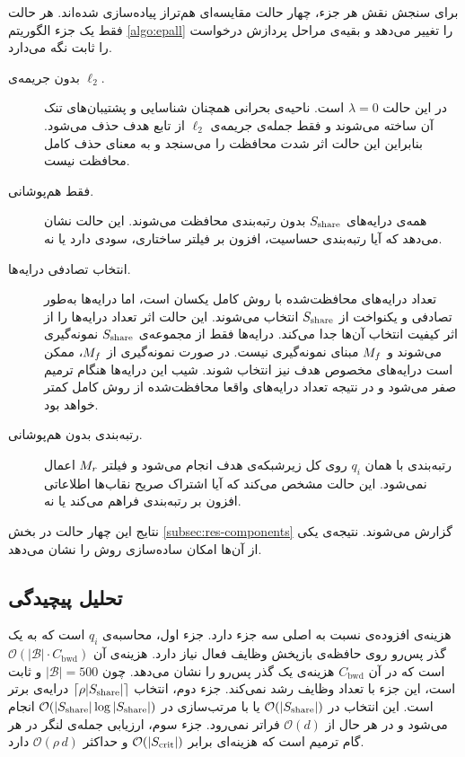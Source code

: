 برای سنجش نقش هر جزء، چهار حالت مقایسه‌ای هم‌تراز پیاده‌سازی شده‌اند. هر حالت فقط یک جزء الگوریتم \ref{algo:epall} را تغییر می‌دهد و بقیه‌ی مراحل پردازش درخواست را ثابت نگه می‌دارد.

\begin{description}
	\item[بدون جریمه‌ی $\ell_2$.] در این حالت $\lambda=0$ است. ناحیه‌ی بحرانی همچنان شناسایی و پشتیبان‌های تنک آن ساخته می‌شوند و فقط جمله‌ی جریمه‌ی $\ell_2$ از تابع هدف حذف می‌شود. بنابراین این حالت اثر شدت محافظت را می‌سنجد و به معنای حذف کامل محافظت نیست.
	\item[فقط هم‌پوشانی.] همه‌ی درایه‌های $S_{\mathrm{share}}$ بدون رتبه‌بندی محافظت می‌شوند. این حالت نشان می‌دهد که آیا رتبه‌بندی حساسیت، افزون بر فیلتر ساختاری، سودی دارد یا نه.
	\item[انتخاب تصادفی درایه‌ها.] تعداد درایه‌های محافظت‌شده با روش کامل یکسان است، اما درایه‌ها به‌طور تصادفی و یکنواخت از $S_{\mathrm{share}}$ انتخاب می‌شوند. این حالت اثر تعداد درایه‌ها را از اثر کیفیت انتخاب آن‌ها جدا می‌کند. درایه‌ها فقط از مجموعه‌ی $S_{\mathrm{share}}$ نمونه‌گیری می‌شوند و $M_f$ مبنای نمونه‌گیری نیست. در صورت نمونه‌گیری از $M_f$، ممکن است درایه‌های مخصوص هدف نیز انتخاب شوند. شیب این درایه‌ها هنگام ترمیم صفر می‌شود و در نتیجه تعداد درایه‌های واقعا محافظت‌شده از روش کامل کمتر خواهد بود.
	\item[رتبه‌بندی بدون هم‌پوشانی.] رتبه‌بندی با همان $q_i$ روی کل زیرشبکه‌ی هدف انجام می‌شود و فیلتر $M_r$ اعمال نمی‌شود. این حالت مشخص می‌کند که آیا اشتراک صریح نقاب‌ها اطلاعاتی افزون بر رتبه‌بندی فراهم می‌کند یا نه.
\end{description}

نتایج این چهار حالت در بخش \ref{subsec:res-components} گزارش می‌شوند. نتیجه‌ی یکی از آن‌ها امکان ساده‌سازی روش را نشان می‌دهد.

\subsection{تحلیل پیچیدگی}
\label{subsec:prop-complexity}

هزینه‌ی افزوده‌ی  نسبت به  اصلی سه جزء دارد. جزء اول، محاسبه‌ی $q_i$ است که به یک گذر پس‌رو روی حافظه‌ی بازپخش وظایف فعال نیاز دارد. هزینه‌ی آن $\mathcal{O}(|\mathcal{B}|\cdot C_{\mathrm{bwd}})$ است که در آن $C_{\mathrm{bwd}}$ هزینه‌ی یک گذر پس‌رو را نشان می‌دهد. چون $|\mathcal{B}|=500$ و ثابت است، این جزء با تعداد وظایف رشد نمی‌کند. جزء دوم، انتخاب $\lceil\rho|S_{\mathrm{share}}|\rceil$ درایه‌ی برتر است. این انتخاب در $\mathcal{O}(|S_{\mathrm{share}}|)$ یا با مرتب‌سازی در $\mathcal{O}(|S_{\mathrm{share}}|\log|S_{\mathrm{share}}|)$ انجام می‌شود و در هر حال از $\mathcal{O}(d)$ فراتر نمی‌رود. جزء سوم، ارزیابی جمله‌ی لنگر در هر گام ترمیم است که هزینه‌ای برابر $\mathcal{O}(|S_{\mathrm{crit}}|)$ و حداکثر $\mathcal{O}(\rho\,d)$ دارد.

